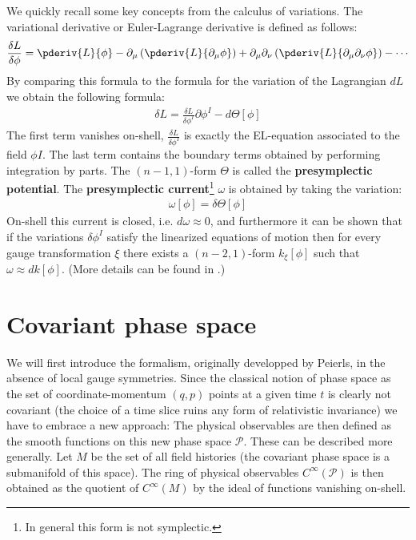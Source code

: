 	We quickly recall some key concepts from the calculus of variations. The variational derivative or Euler-Lagrange derivative is defined as follows:
	\begin{gather}
		\frac{\delta L}{\delta \phi} = \pderiv{L}{\phi} - \partial_\mu\left(\pderiv{L}{\partial_\mu\phi}\right) + \partial_\mu\partial_\nu\left(\pderiv{L}{\partial_\mu\partial_\nu\phi}\right) -\cdots
	\end{gather}
	By comparing this formula to the formula for the variation of the Lagrangian $dL$ we obtain the following formula:
	\begin{gather}
		\delta L = \frac{\delta L}{\delta \phi^I}\partial\phi^I - d\Theta[\phi]
	\end{gather}
	The first term vanishes on-shell, $\frac{\delta L}{\delta \phi^I}$ is exactly the EL-equation associated to the field $\phi I$. The last term contains the boundary terms obtained by performing integration by parts. The $(n-1, 1)$-form $\Theta$ is called the \textbf{presymplectic potential}. The \textbf{presymplectic current}\footnote{In general this form is not symplectic.} $\omega$ is obtained by taking the variation:
	\begin{gather}
		\omega[\phi] = \delta\Theta[\phi]
	\end{gather}
	On-shell this current is closed, i.e. $d\omega\approx0$, and furthermore it can be shown that if the variations $\delta\phi^I$ satisfy the linearized equations of motion then for every gauge transformation $\xi$ there exists a $(n-2, 1)$-form $k_\xi[\phi]$ such that $\omega\approx dk[\phi]$. (More details can be found in \cite{compere}.)

\section{Covariant phase space}

	We will first introduce the formalism, originally developped by Peierls, in the absence of local gauge symmetries. Since the classical notion of phase space as the set of coordinate-momentum $(q,p)$ points at a given time $t$ is clearly not covariant (the choice of a time slice ruins any form of relativistic invariance) we have to embrace a new approach:
	The physical observables are then defined as the smooth functions on this new phase space $\mathcal{P}$. These can be described more generally. Let $M$ be the set of all field histories (the covariant phase space is a submanifold of this space). The ring of physical observables $C^\infty(\mathcal{P})$ is then obtained as the quotient of $C^\infty(M)$ by the ideal of functions vanishing on-shell.